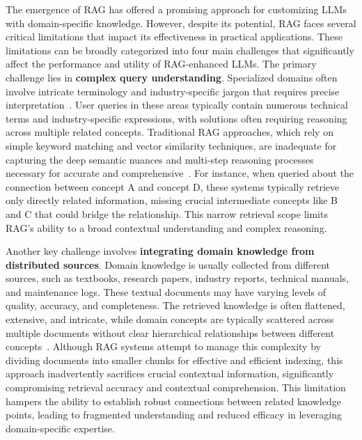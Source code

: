 \documentclass[lettersize,journal]{IEEEtran}
\begin{document}
The emergence of RAG has offered a promising approach for customizing LLMs with domain-specific knowledge. However, despite its potential, RAG faces several critical limitations that impact its effectiveness in practical applications. These limitations can be broadly categorized into four main challenges that significantly affect the performance and utility of RAG-enhanced LLMs.
The primary challenge lies in \textbf{complex query understanding}. Specialized domains often involve intricate terminology and industry-specific jargon that requires precise interpretation~\cite{ling2023domain}. User queries in these areas typically contain numerous technical terms and industry-specific expressions, with solutions often requiring reasoning across multiple related concepts. 
Traditional RAG approaches, which rely on simple keyword matching and vector similarity techniques, are inadequate for capturing the deep semantic nuances and multi-step reasoning processes necessary for accurate and comprehensive~\cite{bruckhaus2024rag}. For instance, when queried about the connection between concept A and concept D, these systems typically retrieve only directly related information, missing crucial intermediate concepts like B and C that could bridge the relationship. This narrow retrieval scope limits RAG's ability to a broad contextual understanding and complex reasoning. 


Another key challenge involves \textbf{integrating domain knowledge from distributed sources}.
Domain knowledge is usually collected from different sources, such as textbooks, research papers, industry reports, technical manuals, and maintenance logs. These textual documents may have varying levels of quality, accuracy, and completeness. The retrieved knowledge is often flattened, extensive, and intricate, while domain concepts are typically scattered across multiple documents without clear hierarchical relationships between different concepts~\cite{Zhang-etal24KnowGPT,sun2024thinkongraph,ma2024think-on-graph-2.0}. Although RAG systems attempt to manage this complexity by dividing documents into smaller chunks for effective and efficient indexing, this approach inadvertently sacrifices crucial contextual information, significantly compromising retrieval accuracy and contextual comprehension. 
This limitation hampers the ability to establish robust connections between related knowledge points, leading to fragmented understanding and reduced efficacy in leveraging domain-specific expertise.
 
\end{document}
